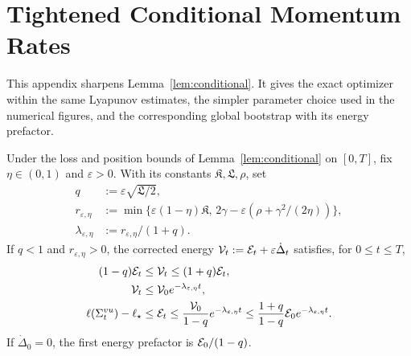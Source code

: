 
\section{Tightened Conditional Momentum Rates}
\label{app:tightened-conditional-momentum}\label{app:momentum-details}

This appendix sharpens Lemma~\ref{lem:conditional}. It gives the exact
optimizer within the same Lyapunov estimates, the simpler parameter
choice used in the numerical figures, and the corresponding global
bootstrap with its energy prefactor.

\begin{proposition}
\label{prop:tightened-conditional-momentum-pl}\label{prop:tightened}
Under the loss and position bounds of Lemma~\ref{lem:conditional} on
$[0,T]$, fix $\eta\in(0,1)$ and $\varepsilon>0$. With its constants
$\mathfrak K,\mathfrak L,\rho$, set
\begin{align}
 q&:=\varepsilon\sqrt{\mathfrak L/2},\label{eq:tightened-momentum-q-definition}\\
 r_{\varepsilon,\eta}
 &:=\min\{\varepsilon(1-\eta)\mathfrak K,\,
          2\gamma-\varepsilon(\rho+\gamma^2/(2\eta))\},\label{eq:tightened-momentum-dissipation-definition}\\
 \lambda_{\varepsilon,\eta}
 &:=r_{\varepsilon,\eta}/(1+q).\label{eq:tightened-momentum-rate-definition}
\end{align}
If $q<1$ and $r_{\varepsilon,\eta}>0$, the corrected energy
$\mathcal V_t:=\mathcal E_t+\varepsilon\dot\Delta_t$ satisfies, for $0\le t\le T$,
\begin{align}
 (1-q)\mathcal E_t&\le\mathcal V_t\le(1+q)\mathcal E_t,\label{eq:tightened-momentum-lyapunov-equivalence}\\
 \mathcal V_t&\le\mathcal V_0e^{-\lambda_{\varepsilon,\eta}t},\label{eq:tightened-conditional-momentum-rate}\\
 \ell(\Sigma^{vu}_t)-\ell_\star
 &\le\mathcal E_t\le\frac{\mathcal V_0}{1-q}e^{-\lambda_{\varepsilon,\eta}t}
 \le\frac{1+q}{1-q}\mathcal E_0e^{-\lambda_{\varepsilon,\eta}t}.\label{eq:tightened-conditional-momentum-loss-rate}
\end{align}
If $\dot\Delta_0=0$, the first energy prefactor is $\mathcal E_0/(1-q)$.
\end{proposition}

